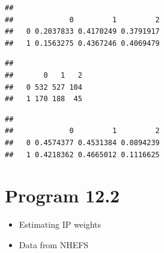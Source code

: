 \documentclass[
  10pt,
]{book}
\newenvironment{Shaded}{\begin{snugshade}}{\end{snugshade}}
\newcommand{\DecValTok}[1]{\textcolor[rgb]{0.00,0.00,0.81}{#1}}
\newcommand{\FunctionTok}[1]{\textcolor[rgb]{0.00,0.00,0.00}{#1}}
\newcommand{\NormalTok}[1]{#1}
\newcommand{\SpecialCharTok}[1]{\textcolor[rgb]{0.00,0.00,0.00}{#1}}
\providecommand{\tightlist}{%
  \setlength{\itemsep}{0pt}\setlength{\parskip}{0pt}}
\begin{document}
\begin{verbatim}
##    
##             0         1         2
##   0 0.2037833 0.4170249 0.3791917
##   1 0.1563275 0.4367246 0.4069479
\end{verbatim}

\begin{Shaded}
\end{Shaded}

\begin{verbatim}
##    
##       0   1   2
##   0 532 527 104
##   1 170 188  45
\end{verbatim}

\begin{Shaded}
\end{Shaded}

\begin{verbatim}
##    
##             0         1         2
##   0 0.4574377 0.4531384 0.0894239
##   1 0.4218362 0.4665012 0.1116625
\end{verbatim}

\hypertarget{program-12.2}{%
\section{Program 12.2}\label{program-12.2}}

\begin{itemize}
\tightlist
\item
  Estimating IP weights
\item
  Data from NHEFS
\end{itemize}
\end{document}
